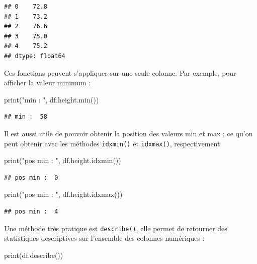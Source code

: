 \documentclass[12pt,]{book}
\newenvironment{Shaded}{\begin{snugshade}}{\end{snugshade}}
\newcommand{\StringTok}[1]{\textcolor[rgb]{0.31,0.60,0.02}{#1}}
\newcommand{\BuiltInTok}[1]{#1}
\newcommand{\NormalTok}[1]{#1}
\numberwithin{equation}{section}
\numberwithin{countremarque}{section}
\begin{document}
\begin{lstlisting}
## 0    72.8
## 1    73.2
## 2    76.6
## 3    75.0
## 4    75.2
## dtype: float64
\end{lstlisting}

Ces fonctions peuvent s'appliquer sur une seule colonne. Par exemple,
pour afficher la valeur minimum :

\begin{Shaded}
\begin{Highlighting}[]
\BuiltInTok{print}\NormalTok{(}\StringTok{"min : "}\NormalTok{, df.height.}\BuiltInTok{min}\NormalTok{())}
\end{Highlighting}
\end{Shaded}

\begin{lstlisting}
## min :  58
\end{lstlisting}

Il est aussi utile de pouvoir obtenir la position des valeurs min et max
; ce qu'on peut obtenir avec les méthodes \texttt{idxmin()} et
\texttt{idxmax()}, respectivement.

\begin{Shaded}
\begin{Highlighting}[]
\BuiltInTok{print}\NormalTok{(}\StringTok{"pos min : "}\NormalTok{, df.height.idxmin())}
\end{Highlighting}
\end{Shaded}

\begin{lstlisting}
## pos min :  0
\end{lstlisting}

\begin{Shaded}
\begin{Highlighting}[]
\BuiltInTok{print}\NormalTok{(}\StringTok{"pos min : "}\NormalTok{, df.height.idxmax())}
\end{Highlighting}
\end{Shaded}

\begin{lstlisting}
## pos min :  4
\end{lstlisting}

Une méthode très pratique est \texttt{describe()}, elle permet de
retourner des statistiques descriptives sur l'ensemble des colonnes
numériques :

\begin{Shaded}
\begin{Highlighting}[]
\BuiltInTok{print}\NormalTok{(df.describe())}
\end{Highlighting}
\end{Shaded}
\end{document}
